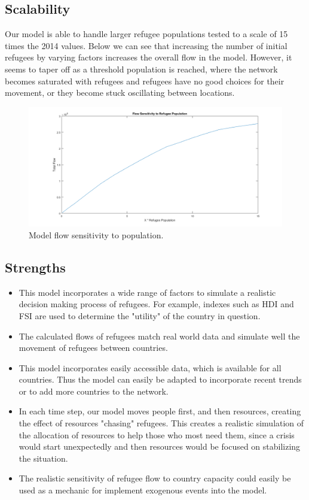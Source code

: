 \documentclass{article}
\begin{document}
\subsection{Scalability}
Our model is able to handle larger refugee populations tested to a scale of 15 times the 2014 values. Below we can see that increasing the number of initial refugees by varying factors increases the overall flow in the model. However, it seems to taper off as a threshold population is reached, where the network becomes saturated with refugees and refugees have no good choices for their movement, or they become stuck oscillating between locations.

\begin{figure}[H]
    \centering
    \includegraphics[width=\textwidth]{Sensitivity3/srpop.png}
    \caption [width=0.6\textwidth]{\centering Model flow sensitivity to population.}
\end{figure}



\subsection{Strengths}
\begin{itemize}
    \item This model incorporates a wide range of factors to simulate a realistic decision making process of refugees. For example, indexes such as HDI and FSI are used to determine the "utility" of the country in question.
    \item The calculated flows of refugees match real world data and simulate well the movement of refugees between countries.
    \item This model incorporates easily accessible data, which is available for all countries. Thus the model can easily be adapted to incorporate recent trends or to add more countries to the network.
    \item In each time step, our model moves people first, and then resources, creating the effect of resources "chasing" refugees. This creates a realistic simulation of the allocation of resources to help those who most need them, since a crisis would start unexpectedly and then resources would be focused on stabilizing the situation.
    \item The realistic sensitivity of refugee flow to country capacity could easily be used as a mechanic for implement exogenous events into the model.
\end{itemize}
\end{document}
